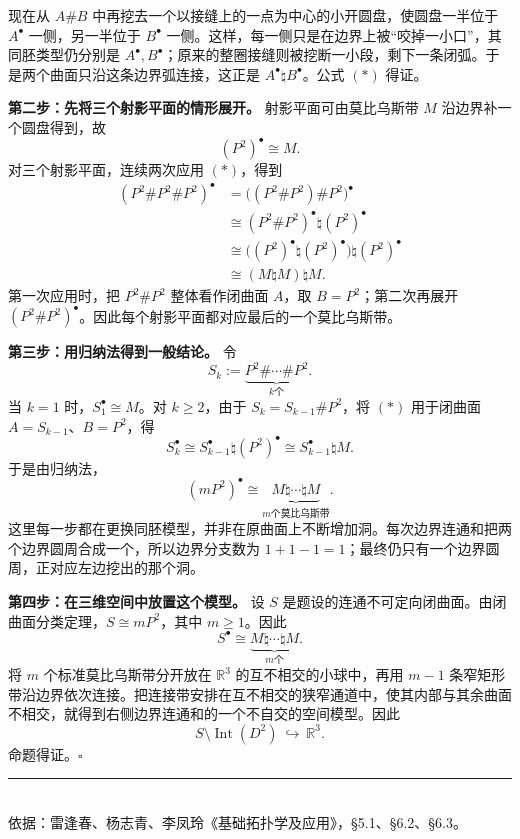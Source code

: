 \documentclass[UTF8,11pt,a4paper]{ctexart}
\newcommand{\R}{\mathbb R}
\begin{document}
现在从 \(A\# B\) 中再挖去一个以接缝上的一点为中心的小开圆盘，使圆盘一半位于 \(A^\bullet\) 一侧，另一半位于 \(B^\bullet\) 一侧。这样，每一侧只是在边界上被“咬掉一小口”，其同胚类型仍分别是 \(A^\bullet,B^\bullet\)；原来的整圈接缝则被挖断一小段，剩下一条闭弧。于是两个曲面只沿这条边界弧连接，这正是 \(A^\bullet\natural B^\bullet\)。公式 \((*)\) 得证。

\textbf{第二步：先将三个射影平面的情形展开。}
射影平面可由莫比乌斯带 \(M\) 沿边界补一个圆盘得到，故
\[
 (P^2)^\bullet\cong M.
\]
对三个射影平面，连续两次应用 \((*)\)，得到
\[
\begin{aligned}
 (P^2\#P^2\#P^2)^\bullet
 &=\bigl((P^2\#P^2)\#P^2\bigr)^\bullet\\
 &\cong(P^2\#P^2)^\bullet\natural(P^2)^\bullet\\
 &\cong\bigl((P^2)^\bullet\natural(P^2)^\bullet\bigr)\natural(P^2)^\bullet\\
 &\cong(M\natural M)\natural M.
\end{aligned}
\]
第一次应用时，把 \(P^2\#P^2\) 整体看作闭曲面 \(A\)，取 \(B=P^2\)；第二次再展开 \((P^2\#P^2)^\bullet\)。因此每个射影平面都对应最后的一个莫比乌斯带。

\textbf{第三步：用归纳法得到一般结论。}
令
\[
 S_k:=\underbrace{P^2\#\cdots\#P^2}_{k\text{个}}.
\]
当 \(k=1\) 时，\(S_1^\bullet\cong M\)。对 \(k\ge2\)，由于 \(S_k=S_{k-1}\#P^2\)，将 \((*)\) 用于闭曲面 \(A=S_{k-1}\)、\(B=P^2\)，得
\[
 S_k^\bullet\cong S_{k-1}^\bullet\natural(P^2)^\bullet
 \cong S_{k-1}^\bullet\natural M.
\]
于是由归纳法，
\[
 \boxed{\ (mP^2)^\bullet\cong
 \underbrace{M\natural\cdots\natural M}_{m\text{个莫比乌斯带}}.\ }
\]
这里每一步都在更换同胚模型，并非在原曲面上不断增加洞。每次边界连通和把两个边界圆周合成一个，所以边界分支数为 \(1+1-1=1\)；最终仍只有一个边界圆周，正对应左边挖出的那个洞。

\textbf{第四步：在三维空间中放置这个模型。}
设 \(S\) 是题设的连通不可定向闭曲面。由闭曲面分类定理，\(S\cong mP^2\)，其中 \(m\ge1\)。因此
\[
 S^\bullet\cong\underbrace{M\natural\cdots\natural M}_{m\text{个}}.
\]
将 \(m\) 个标准莫比乌斯带分开放在 \(\R^3\) 的互不相交的小球中，再用 \(m-1\) 条窄矩形带沿边界依次连接。把连接带安排在互不相交的狭窄通道中，使其内部与其余曲面不相交，就得到右侧边界连通和的一个不自交的空间模型。因此
\[
 \boxed{\ S\setminus\operatorname{Int}(D^2)\ \hookrightarrow\ \R^3.\ }
\]
命题得证。\hfill\(\square\)

\vspace{5mm}
\begin{center}
\rule{0.35\textwidth}{0.35pt}\\[4pt]
\small 依据：雷逢春、杨志青、李凤玲《基础拓扑学及应用》，\S 5.1、\S 6.2、\S 6.3。
\end{center}
\end{document}
